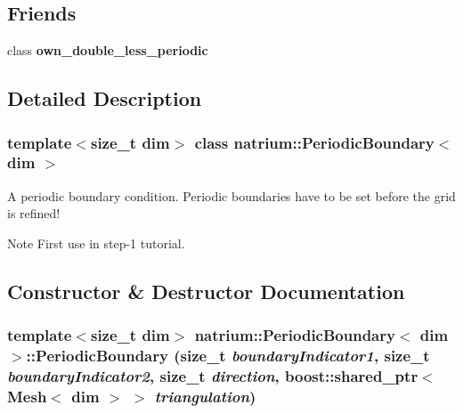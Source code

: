 \subsection*{Friends}
\begin{DoxyCompactItemize}
\item 
\hypertarget{classnatrium_1_1PeriodicBoundary_a92462e8f67aa8d5e91e018a1cce70842}{
class {\bfseries own\_\-double\_\-less\_\-periodic}}
\label{classnatrium_1_1PeriodicBoundary_a92462e8f67aa8d5e91e018a1cce70842}

\end{DoxyCompactItemize}


\subsection{Detailed Description}
\subsubsection*{template$<$size\_\-t dim$>$ class natrium::PeriodicBoundary$<$ dim $>$}

A periodic boundary condition. Periodic boundaries have to be set before the grid is refined! \begin{DoxyNote}{Note}
First use in step-\/1 tutorial. 
\end{DoxyNote}


\subsection{Constructor \& Destructor Documentation}
\hypertarget{classnatrium_1_1PeriodicBoundary_ad105994a331755f654822813875771d8}{
\subsubsection[{PeriodicBoundary}]{\setlength{\rightskip}{0pt plus 5cm}template$<$size\_\-t dim$>$ {\bf natrium::PeriodicBoundary}$<$ dim $>$::{\bf PeriodicBoundary} (size\_\-t {\em boundaryIndicator1}, \/  size\_\-t {\em boundaryIndicator2}, \/  size\_\-t {\em direction}, \/  boost::shared\_\-ptr$<$ Mesh$<$ dim $>$ $>$ {\em triangulation})}}
\label{classnatrium_1_1PeriodicBoundary_ad105994a331755f654822813875771d8}



